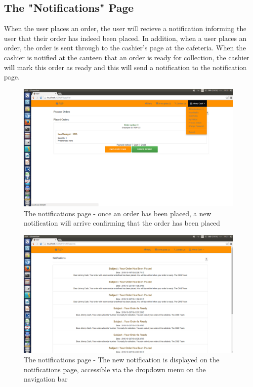 \documentclass[a4paper,12pt]{report}
\begin{document}
\subsection{The "Notifications" Page} 
When the user places an order, the user will recieve a notification informing the user that their order has indeed been placed. In addition, when a user places an order, the order is sent through to the cashier's page at the cafeteria. When the cashier is notified at the canteen that an order is ready for collection, the cashier will mark this order as ready and this will send a notification to the notification page.

\begin{figure}[H]
  \centering
    \includegraphics[width=1.0\textwidth]{screenshots/not1.png}
    \caption{The notifications page -  once an order has been placed, a new notification will arrive confirming that the order has been placed} 
\end{figure}

\begin{figure}[H]
  \centering
    \includegraphics[width=1.0\textwidth]{screenshots/not2.png}
    \caption{The notifications page -  The new notification is displayed on the notifications page, accessible via the dropdown menu on the navigation bar} 
\end{figure}
\end{document}
